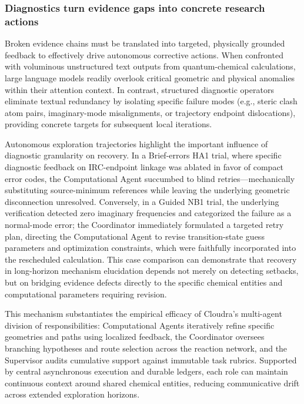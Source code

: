 \subsubsection{Diagnostics turn evidence gaps into concrete research actions}

Broken evidence chains must be translated into targeted, physically grounded feedback to effectively drive autonomous corrective actions. When confronted with voluminous unstructured text outputs from quantum-chemical calculations, large language models readily overlook critical geometric and physical anomalies within their attention context. In contrast, structured diagnostic operators eliminate textual redundancy by isolating specific failure modes (e.g., steric clash atom pairs, imaginary-mode misalignments, or trajectory endpoint dislocations), providing concrete targets for subsequent local iterations.

Autonomous exploration trajectories highlight the important influence of diagnostic granularity on recovery. In a Brief-errors HA1 trial, where specific diagnostic feedback on IRC-endpoint linkage was ablated in favor of compact error codes, the Computational Agent succumbed to blind retries—mechanically substituting source-minimum references while leaving the underlying geometric disconnection unresolved. Conversely, in a Guided NB1 trial, the underlying verification detected zero imaginary frequencies and categorized the failure as a normal-mode error; the Coordinator immediately formulated a targeted retry plan, directing the Computational Agent to revise transition-state guess parameters and optimization constraints, which were faithfully incorporated into the rescheduled calculation. This case comparison can demonstrate that recovery in long-horizon mechanism elucidation depends not merely on detecting setbacks, but on bridging evidence defects directly to the specific chemical entities and computational parameters requiring revision.\citep{ref18}

This mechanism substantiates the empirical efficacy of Cloudra's multi-agent division of responsibilities: Computational Agents iteratively refine specific geometries and paths using localized feedback, the Coordinator oversees branching hypotheses and route selection across the reaction network, and the Supervisor audits cumulative support against immutable task rubrics. Supported by central asynchronous execution and durable ledgers, each role can maintain continuous context around shared chemical entities, reducing communicative drift across extended exploration horizons.

